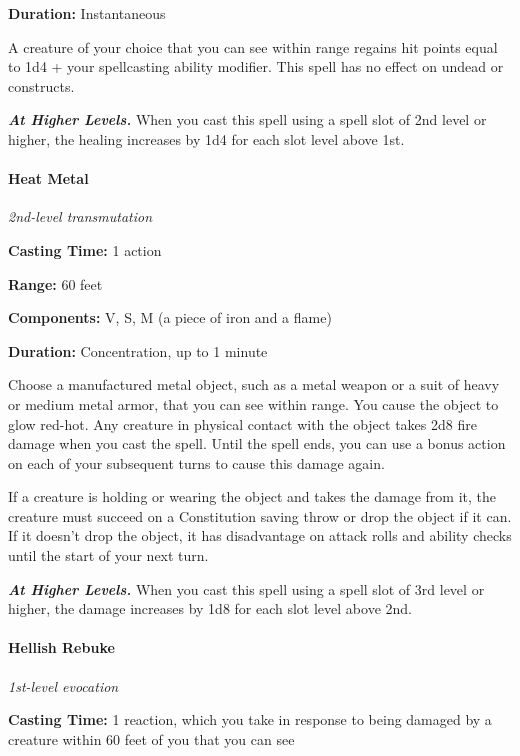 \documentclass[
]{article}
\begin{document}
\textbf{Duration:} Instantaneous

A creature of your choice that you can see within range regains hit
points equal to 1d4 + your spellcasting ability modifier. This spell has
no effect on undead or constructs.

\emph{\textbf{At Higher Levels.}} When you cast this spell using a spell
slot of 2nd level or higher, the healing increases by 1d4 for each slot
level above 1st.

\hypertarget{heat-metal}{%
\paragraph{Heat Metal}\label{heat-metal}}

\emph{2nd-level transmutation}

\textbf{Casting Time:} 1 action

\textbf{Range:} 60 feet

\textbf{Components:} V, S, M (a piece of iron and a flame)

\textbf{Duration:} Concentration, up to 1 minute

Choose a manufactured metal object, such as a metal weapon or a suit of
heavy or medium metal armor, that you can see within range. You cause
the object to glow red-hot. Any creature in physical contact with the
object takes 2d8 fire damage when you cast the spell. Until the spell
ends, you can use a bonus action on each of your subsequent turns to
cause this damage again.

If a creature is holding or wearing the object and takes the damage from
it, the creature must succeed on a Constitution saving throw or drop the
object if it can. If it doesn't drop the object, it has disadvantage on
attack rolls and ability checks until the start of your next turn.

\emph{\textbf{At Higher Levels.}} When you cast this spell using a spell
slot of 3rd level or higher, the damage increases by 1d8 for each slot
level above 2nd.

\hypertarget{hellish-rebuke}{%
\paragraph{Hellish Rebuke}\label{hellish-rebuke}}

\emph{1st-level evocation}

\textbf{Casting Time:} 1 reaction, which you take in response to being
damaged by a creature within 60 feet of you that you can see
\end{document}
